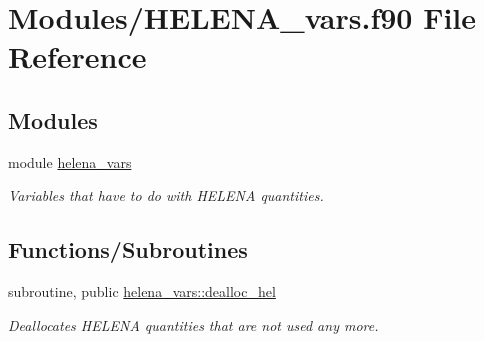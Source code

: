 \hypertarget{HELENA__vars_8f90}{}\section{Modules/\+H\+E\+L\+E\+N\+A\+\_\+vars.f90 File Reference}
\label{HELENA__vars_8f90}
\subsection*{Modules}
\begin{DoxyCompactItemize}
\item 
module \hyperlink{namespacehelena__vars}{helena\+\_\+vars}
\begin{DoxyCompactList}\small\item\em Variables that have to do with H\+E\+L\+E\+NA quantities. \end{DoxyCompactList}\end{DoxyCompactItemize}
\subsection*{Functions/\+Subroutines}
\begin{DoxyCompactItemize}
\item 
subroutine, public \hyperlink{namespacehelena__vars_add7b3eea7306eca7fb45737ff915523f}{helena\+\_\+vars\+::dealloc\+\_\+hel}
\begin{DoxyCompactList}\small\item\em Deallocates H\+E\+L\+E\+NA quantities that are not used any more. \end{DoxyCompactList}\end{DoxyCompactItemize}
